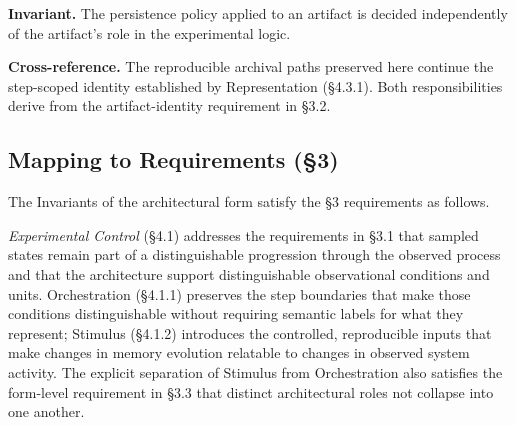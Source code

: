   \textbf{Invariant.} The persistence policy applied to an artifact is decided independently of the artifact's role in the experimental logic.

  \textbf{Cross-reference.} The reproducible archival paths preserved here continue the step-scoped identity established by Representation (\S4.3.1). Both responsibilities derive from the artifact-identity requirement in \S3.2.

\subsection*{Mapping to Requirements (§3)}

The Invariants of the architectural form satisfy the §3 requirements as follows.


\emph{Experimental Control} (\S4.1) addresses the requirements in \S3.1 that sampled states remain part of a distinguishable progression through the observed process and that the architecture support distinguishable observational conditions and units. Orchestration (\S4.1.1) preserves the step boundaries that make those conditions distinguishable without requiring semantic labels for what they represent; Stimulus (\S4.1.2) introduces the controlled, reproducible inputs that make changes in memory evolution relatable to changes in observed system activity. The explicit separation of Stimulus from Orchestration also satisfies the form-level requirement in \S3.3 that distinct architectural roles not collapse into one another.


